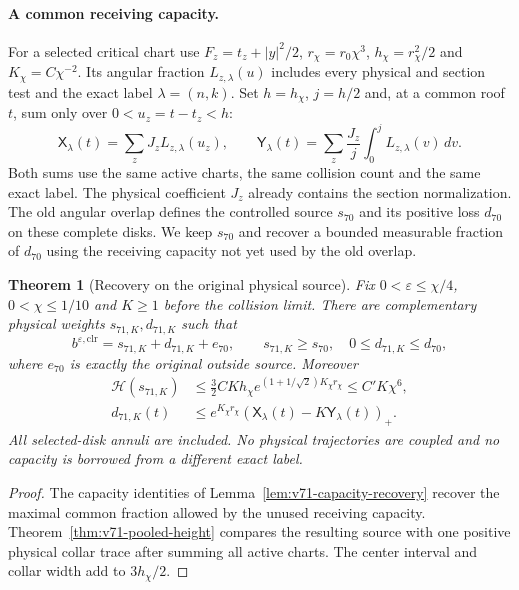 \documentclass[11pt,reqno]{amsart}
\numberwithin{equation}{section}
\newtheorem{leadtheorem}{Theorem}
\theoremstyle{definition}\newtheorem{definition}[theorem]{Definition}
\theoremstyle{remark}\newtheorem{remark}[theorem]{Remark}
\begin{document}
\paragraph{A common receiving capacity.}
For a selected critical chart use $F_z=t_z+|y|^2/2$,
$r_\chi=r_0\chi^3$, $h_\chi=r_\chi^2/2$ and
$K_\chi=C\chi^{-2}$. Its angular fraction
$L_{z,\lambda}(u)$ includes every physical and section test and the
exact label $\lambda=(n,k)$. Set $h=h_\chi$, $j=h/2$ and, at a
common roof $t$, sum only over $0<u_z=t-t_z<h$:
\[
 \mathsf X_\lambda(t)=\sum_zJ_zL_{z,\lambda}(u_z),\qquad
 \mathsf Y_\lambda(t)=\sum_z\frac{J_z}{j}
                                  \int_0^jL_{z,\lambda}(v)\,dv.
\]
Both sums use the same active charts, the same collision count and
the same exact label. The physical coefficient $J_z$ already contains
the section normalization. The old angular overlap defines the
controlled source $s_{70}$ and its positive loss $d_{70}$ on these
complete disks. We keep $s_{70}$ and recover a bounded measurable
fraction of $d_{70}$ using the receiving capacity not yet used by
the old overlap.

\begin{leadtheorem}[Recovery on the original physical source]
\label{thm:intro-v71-recovery}
Fix $0<\varepsilon\le\chi/4$, $0<\chi\le1/10$ and $K\ge1$
before the collision limit. There are complementary physical weights
$s_{71,K},d_{71,K}$ such that
\[
 b^{\varepsilon,\mathrm{clr}}=s_{71,K}+d_{71,K}+e_{70},\qquad
 s_{71,K}\ge s_{70},\quad 0\le d_{71,K}\le d_{70},
\]
where $e_{70}$ is exactly the original outside source. Moreover
\begin{align*}
 \mathcal H(s_{71,K})
   &\le \tfrac32 CK h_\chi
              e^{(1+1/\sqrt2)K_\chi r_\chi}\le C'K\chi^6,\\
 d_{71,K}(t)&\le e^{K_\chi r_\chi}
                         (\mathsf X_\lambda(t)-K\mathsf Y_\lambda(t))_+.
\end{align*}
All selected-disk annuli are included. No physical trajectories are
coupled and no capacity is borrowed from a different exact label.
\end{leadtheorem}
\begin{proof}
The capacity identities of Lemma~\ref{lem:v71-capacity-recovery}
recover the maximal common fraction allowed by the unused receiving
capacity. Theorem~\ref{thm:v71-pooled-height} compares the resulting
source with one positive physical collar trace after summing all active
charts. The center interval and collar width add to $3h_\chi/2$.
\end{proof}
\end{document}
